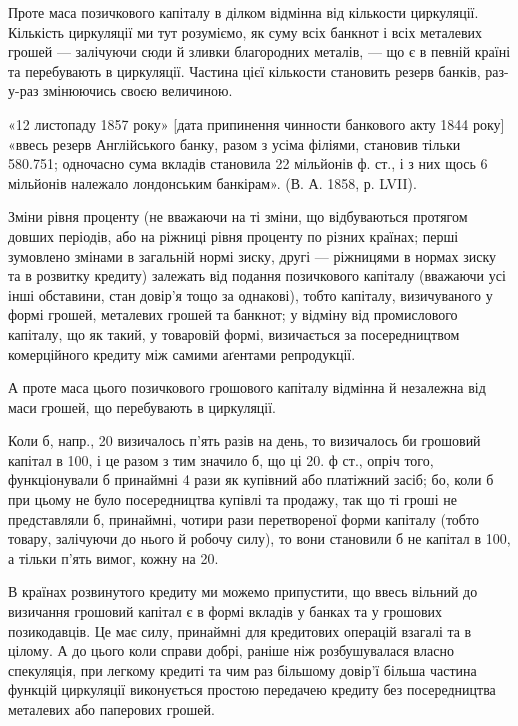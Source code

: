 
Проте маса позичкового капіталу в ділком відмінна від кількости циркуляції.
Кількість циркуляції ми тут розуміємо, як суму всіх банкнот і всіх металевих
грошей — залічуючи сюди й зливки благородних металів, — що є в певній
країні та перебувають в циркуляції. Частина цієї кількости становить резерв
банків, раз-у-раз змінюючись своєю величиною.

«12 листопаду 1857 року» [дата припинення чинности банкового акту
1844 року] «ввесь резерв Англійського банку, разом з усіма філіями, становив
тільки \num{580.751}; одночасно сума вкладів становила 22 мільйонів ф. ст.,
і з них щось 6 мільйонів належало лондонським банкірам». (В. А. 1858, р. LVII).

Зміни рівня проценту (не вважаючи на ті зміни, що відбуваються протягом
довших періодів, або на ріжниці рівня проценту по різних країнах; перші
зумовлено змінами в загальній нормі зиску, другі — ріжницями в нормах зиску
та в розвитку кредиту) залежать від подання позичкового капіталу (вважаючи
усі інші обставини, стан довір’я тощо за однакові), тобто капіталу, визичуваного
у формі грошей, металевих грошей та банкнот; у відміну від промислового
капіталу, що як такий, у товаровій формі, визичається за посередництвом
комерційного кредиту між самими аґентами репродукції.

А проте маса цього позичкового грошового капіталу відмінна й незалежна
від маси грошей, що перебувають в циркуляції.

Коли б, напр., 20 визичалось п’ять разів на день, то визичалось би
грошовий капітал в 100, і це разом з тим значило б, що ці 20. ф ст.,
опріч того, функціонували б принаймні 4 рази як купівний або платіжний
засіб; бо, коли б при цьому не було посередництва купівлі та продажу, так
що ті гроші не представляли б, принаймні, чотири рази перетвореної форми
капіталу (тобто товару, залічуючи до нього й робочу силу), то вони становили б
не капітал в 100, а тільки п’ять вимог, кожну на 20.

В країнах розвинутого кредиту ми можемо припустити, що ввесь вільний до
визичання грошовий капітал є в формі вкладів у банках та у грошових позикодавців.
Це має силу, принаймні для кредитових операцій взагалі та в цілому. А до цього
коли справи добрі, раніше ніж розбушувалася власно спекуляція, при легкому кредиті
та чим раз більшому довір’ї більша частина функцій циркуляції виконується
простою передачею кредиту без посередництва металевих або паперових грошей.

